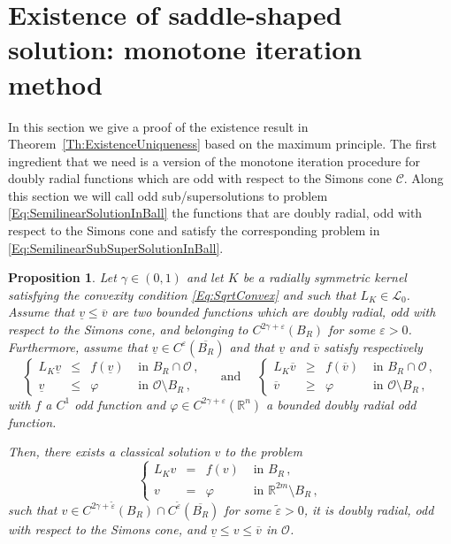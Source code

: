 \documentclass[12pt,reqno]{amsart}
\newtheorem{proposition}[theorem]{Proposition}
\theoremstyle{definition}
\theoremstyle{remark}
\newcommand{\con}[1]{\mathbb{#1}}
\newcommand{\R}{\con{R}} %
\newcommand{\ccal}{\mathscr{C}}
\newcommand{\lcal}{\mathcal{L}}
\newcommand{\ocal}{\mathcal{O}}
\newcommand{\s}{\gamma}
\newcommand\beqc[1]{\left\{\begin{array}{#1}}
\newcommand\eeqc{\end{array} \right.}
\def\PDEsystem{rcll}
\newcommand{\vsub}{\underline{v}}
\newcommand{\vsup}{\overline{v}}
\numberwithin{equation}{section}
\begin{document}


\section{Existence of saddle-shaped solution: monotone iteration method}
\label{Sec:Existence}


In this section we give a proof of the existence result in Theorem~\ref{Th:ExistenceUniqueness} based on the maximum principle. The first ingredient that we need is a version of the monotone iteration procedure for doubly radial functions which are odd with respect to the Simons cone $\ccal$.
Along this section we will call odd sub/supersolutions to problem \eqref{Eq:SemilinearSolutionInBall} the functions that are doubly radial, odd with respect to the Simons cone and satisfy the corresponding problem in \eqref{Eq:SemilinearSubSuperSolutionInBall}. 


\begin{proposition}
	\label{Prop:MonotoneIterationOdd}
	Let $\s\in (0,1)$ and let $K$ be a radially symmetric kernel  satisfying the convexity condition \eqref{Eq:SqrtConvex} and such that $L_K\in \lcal_0$. Assume that $\vsub \leq \vsup$ are two bounded functions which are doubly radial, odd with respect to the Simons cone, and belonging to $C^{2\s + \varepsilon} (B_R)$ for some $\varepsilon>0$. Furthermore, assume that $\vsub\in C^\varepsilon(\overline{B_R})$ and that $\vsub$ and $\vsup$ satisfy respectively   
	\begin{equation}
	\label{Eq:SemilinearSubSuperSolutionInBall}
	\beqc{\PDEsystem}
	L_K\vsub & \leq & f(\vsub) & \textrm{ in } B_R \cap \ocal\,, \\
	\vsub & \leq & \varphi & \textrm{ in } \ocal \setminus B_R\,, 
	\eeqc
	\quad \textrm{ and } \quad 
	\beqc{\PDEsystem}
	L_K\vsup & \geq & f(\vsup) & \textrm{ in } B_R \cap \ocal\,, \\
	\vsup & \geq & \varphi & \textrm{ in } \ocal \setminus B_R\,, 
	\eeqc
	\end{equation}
	with $f$ a $C^1$ odd function and $\varphi\in C^{2\s+\varepsilon}(\R^n)$ a bounded doubly radial odd function.
	
	Then, there exists a classical solution $v$ to the problem
	\begin{equation}
	\label{Eq:SemilinearSolutionInBall}
	\beqc{\PDEsystem}
	L_K v & = & f(v) & \textrm{ in } B_R\,, \\
	v &=& \varphi &  \textrm{ in } \R^{2m} \setminus B_R\,, 
	\eeqc
	\end{equation}
	such that $v\in C^{2\s+\tilde\varepsilon}(B_R)\cap  C^{\tilde\varepsilon}(\overline{B_R}) $ for some $\tilde\varepsilon>0$, it is doubly radial, odd with respect to the Simons cone, and  $\vsub \leq v \leq \vsup$ in $\ocal$.
\end{proposition}
\end{document}
